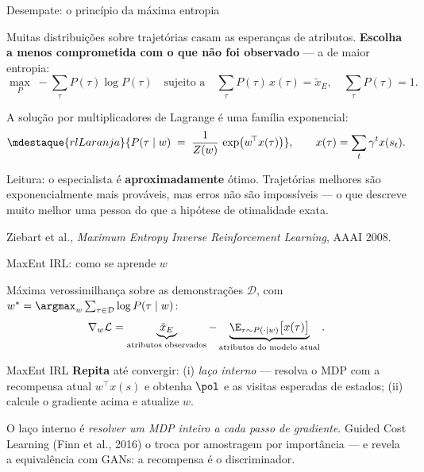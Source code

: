 \documentclass[aspectratio=169, 11pt]{beamer}
\newcommand{\Dset}{\mathcal{D}}
\newcommand{\traj}{\tau}
\begin{document}
\begin{frame}{Desempate: o princípio da máxima entropia}

  Muitas distribuições sobre trajetórias casam as esperanças de atributos.
  \textbf{Escolha a menos comprometida com o que não foi observado} --- a de
  maior entropia:
  \[
    \max_{P}\; -\sum_{\traj} P(\traj)\log P(\traj)
    \quad\text{sujeito a}\quad
    \sum_{\traj} P(\traj)\, x(\traj) = \tilde{x}_{E},
    \quad \sum_{\traj}P(\traj) = 1 .
  \]

  \pause
  A solução por multiplicadores de Lagrange é uma família exponencial:
  \[
    \mdestaque{rlLaranja}{P(\traj \mid w) \;=\; \frac{1}{Z(w)}\,
      \exp\bigl(w^{\!\top} x(\traj)\bigr)},
    \qquad
    x(\traj) = \sum_{t} \gamma^{t} x(s_t).
  \]

  \begin{ideiabox}
    Leitura: o especialista é \textbf{aproximadamente} ótimo. Trajetórias
    melhores são exponencialmente mais prováveis, mas erros não são impossíveis
    --- o que descreve muito melhor uma pessoa do que a hipótese de otimalidade
    exata.
  \end{ideiabox}

  {\scriptsize\color{rlCinza}Ziebart et al., \emph{Maximum Entropy Inverse
  Reinforcement Learning}, AAAI 2008.}
\end{frame}

\begin{frame}{MaxEnt IRL: como se aprende $w$}

  Máxima verossimilhança sobre as demonstrações $\Dset$, com
  $w^{*} = \argmax_{w} \sum_{\traj \in \Dset} \log P(\traj\mid w)$:
  \[
    \nabla_w \mathcal{L} = \underbrace{\tilde{x}_{E}}_{\text{atributos observados}}
      - \underbrace{\E_{\traj \sim P(\cdot\mid w)}\bigl[x(\traj)\bigr]}_{\text{atributos do modelo atual}} .
  \]

  \begin{algbox}{MaxEnt IRL}
    {\footnotesize
    \textbf{Repita} até convergir: (i) \emph{laço interno} --- resolva o MDP com
    a recompensa atual $w^{\!\top}x(s)$ e obtenha $\pol$ e as visitas esperadas
    de estados; (ii) calcule o gradiente acima e atualize $w$.}
  \end{algbox}

  \begin{alertabox}
    O laço interno é \emph{resolver um MDP inteiro a cada passo de gradiente}.
    Guided Cost Learning (Finn et al., 2016) o troca por amostragem por
    importância --- e revela a equivalência com GANs: a recompensa é o
    discriminador.
  \end{alertabox}
\end{frame}
\end{document}
